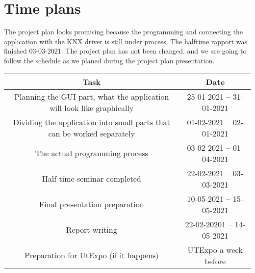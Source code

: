 \documentclass{article}
\begin{document}
\section{Time plans}
The project plan looks promising because the programming and connecting the application with the KNX driver is still under process. The halftime rapport was finished 03-03-2021. The project plan has not been changed, and we are going to follow the schedule as we planed during the project plan presentation. \\

\begin{table}[h!]

    \begin{tabular}{|c|c|}
        \hline
        \textbf {Task} & \textbf{Date}  \\
        \hline
        Planning the GUI part, what the application will look like graphically & 25-01-2021 -- 31-01-2021 \\
        \hline
        Dividing the application into small parts that can be worked separately & 01-02-2021 -- 02-01-2021\\
        \hline
        The actual programming process & 03-02-2021 -- 01-04-2021\\
        \hline
        Half-time seminar completed & 22-02-2021 -- 03-03-2021\\
        \hline
        Final presentation preparation & 10-05-2021 -- 15-05-2021 \\
        \hline
        Report writing & 22-02-20201 -- 14-05-2021\\
        \hline
        Preparation for UtExpo (if it happens) & UTExpo a week before \\
        \hline
    \end{tabular}
\end{table}
\newpage



\end{document}
